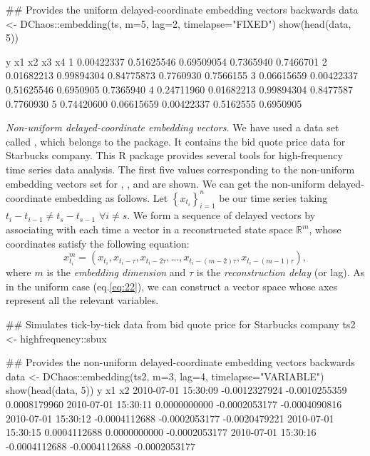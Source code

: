 \begin{example}
## Provides the uniform delayed-coordinate embedding vectors backwards
data  <- DChaos::embedding(ts, m=5, lag=2, timelapse="FIXED")
show(head(data, 5))

           y         x1         x2        x3        x4
1 0.00422337 0.51625546 0.69509054 0.7365940 0.7466701
2 0.01682213 0.99894304 0.84775873 0.7760930 0.7566155
3 0.06615659 0.00422337 0.51625546 0.6950905 0.7365940
4 0.24711960 0.01682213 0.99894304 0.8477587 0.7760930
5 0.74420600 0.06615659 0.00422337 0.5162555 0.6950905
\end{example}

\textit{Non-uniform delayed-coordinate embedding vectors.} We have used a data set called , which belongs to the  package. It contains the bid quote price data for Starbucks company. This R package provides several tools for high-frequency time series data analysis. The first five values corresponding to the non-uniform embedding vectors set for , , and  are shown. We can get the non-uniform delayed-coordinate embedding as follows. Let $\left\{ {{x_{{t_i}}}} \right\}_{{i} = 1}^n$ be our time series taking ${t_i} - {t_{i - 1}} \ne {t_s} - {t_{s - 1}}$ $\forall i \ne s$. We form a sequence of delayed vectors by associating with each time a vector in a reconstructed state space ${\mathbb{R}^m}$, whose coordinates satisfy the following equation:
\begin{equation}
x_{{t_i}}^m = \left( {{x_{{t_i}}},{x_{{t_i} - \tau }},{x_{{t_i} - 2\tau }}, \ldots ,{x_{{t_i} - \left( {m - 2} \right)\tau }},{x_{{t_i} - \left( {m - 1} \right)\tau }}} \right), 
\label{eq:23}
\end{equation}
where $m$ is the \textit{embedding dimension} and $\tau$ is the \textit{reconstruction delay} (or lag). As in the uniform case (eq.\ref{eq:22}), we can construct a vector space whose axes represent all the relevant variables.

\begin{example}
## Simulates tick-by-tick data from bid quote price for Starbucks company 
ts2    <- highfrequency::sbux

## Provides the non-uniform delayed-coordinate embedding vectors backwards
data  <- DChaos::embedding(ts2, m=3, lag=4, timelapse="VARIABLE")
show(head(data, 5))
                                y            x1            x2
2010-07-01 15:30:09 -0.0012327924 -0.0010255359  0.0008179960
2010-07-01 15:30:11  0.0000000000 -0.0002053177 -0.0004090816
2010-07-01 15:30:12 -0.0004112688 -0.0002053177 -0.0020479221
2010-07-01 15:30:15  0.0004112688  0.0000000000 -0.0002053177
2010-07-01 15:30:16 -0.0004112688 -0.0004112688 -0.0002053177
\end{example}

